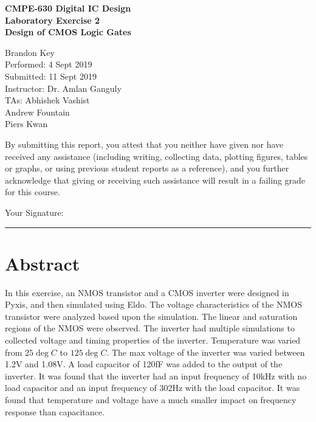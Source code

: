 \documentclass[11pt]{article}
\begin{document}
%
%

\vspace*{2 cm}

\begin{center}
\bf{CMPE-630 Digital IC Design\\
    Laboratory Exercise 2\\
\vspace{0.25 cm}
Design of CMOS Logic Gates
}
\end{center}

\vspace{6 cm}

\begin{flushright}
Brandon Key\\
Performed: 4 Sept 2019\\
Submitted: 11 Sept 2019\\
\vspace{0.5 cm}
Instructor: Dr. Amlan Ganguly\\
TAs: Abhishek Vashist\\
Andrew Fountain\\
Piers Kwan\\
\vspace{0.5 cm}
\end{flushright}

\vspace{3 cm}
\indent By submitting this report, you attest that you neither have given nor have received any assistance (including writing, collecting data, plotting figures, tables or graphs, or using previous student reports as a reference), and you further acknowledge that giving or receiving such assistance will result in a failing grade for this course.

\vspace{1 cm}
Your Signature:   \rule{13cm}{.1pt}


\tableofcontents
\newpage

\section{Abstract}
	In this exercise, an NMOS transistor and a CMOS inverter were designed in Pyxis, and then simulated using Eldo. The voltage characteristics of the NMOS transistor were analyzed based upon the simulation. The linear and saturation regions of the NMOS were observed. The inverter had multiple simulations to collected voltage and timing properties of the inverter. Temperature was varied from $25\deg C$ to $125\deg C$. The max voltage of the inverter was varied between 1.2V and 1.08V. A load capacitor of 120fF was added to the output of the inverter. It was found that the inverter had an input frequency of 10kHz with no load capacitor and an input frequency of 302Hz with the load capacitor. It was found that temperature and voltage have a much smaller impact on frequency response than capacitance. 
\end{document}
